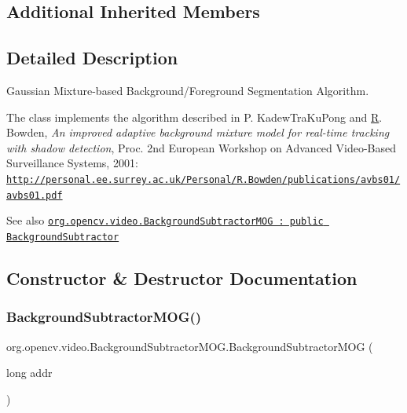 \subsection*{Additional Inherited Members}


\subsection{Detailed Description}
Gaussian Mixture-\/based Background/\+Foreground Segmentation Algorithm.

The class implements the algorithm described in P. Kadew\+Tra\+Ku\+Pong and \mbox{\hyperlink{classorg_1_1opencv_1_1_r}{R}}. Bowden, {\itshape An improved adaptive background mixture model for real-\/time tracking with shadow detection}, Proc. 2nd European Workshop on Advanced Video-\/\+Based Surveillance Systems, 2001\+: \href{http://personal.ee.surrey.ac.uk/Personal/R.Bowden/publications/avbs01/avbs01.pdf}{\tt http\+://personal.\+ee.\+surrey.\+ac.\+uk/\+Personal/\+R.\+Bowden/publications/avbs01/avbs01.\+pdf}

\begin{DoxySeeAlso}{See also}
\href{http://docs.opencv.org/modules/video/doc/motion_analysis_and_object_tracking.html#backgroundsubtractormog}{\tt org.\+opencv.\+video.\+Background\+Subtractor\+M\+OG \+: public Background\+Subtractor} 
\end{DoxySeeAlso}


\subsection{Constructor \& Destructor Documentation}
\mbox{\label{classorg_1_1opencv_1_1video_1_1_background_subtractor_m_o_g_adb3b162d4343ea7625cc1c2ef18e5955}} 
\subsubsection{\texorpdfstring{Background\+Subtractor\+M\+O\+G()}{BackgroundSubtractorMOG()}\hspace{0.1cm}{\footnotesize\ttfamily [1/4]}}
{\footnotesize\ttfamily org.\+opencv.\+video.\+Background\+Subtractor\+M\+O\+G.\+Background\+Subtractor\+M\+OG (\begin{DoxyParamCaption}\item[{long}]{addr }\end{DoxyParamCaption})\hspace{0.3cm}{\ttfamily [protected]}}

